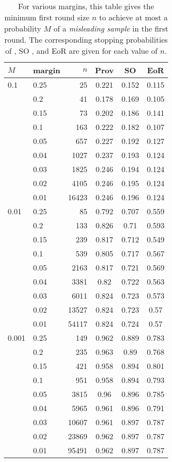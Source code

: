 \begin{table}
\center
\begin{tabular}{ |l|l|r|c|c|c| }
\hline
$M$ & margin & $n$ & Prov & SO & EoR \\
\hline
0.1&0.25&25&0.221&0.152&0.115\\
&0.2&41&0.178&0.169&0.105\\
&0.15&73&0.202&0.186&0.141\\
&0.1&163&0.222&0.182&0.107\\
&0.05&657&0.227&0.192&0.127\\
&0.04&1027&0.237&0.193&0.124\\
&0.03&1825&0.246&0.194&0.124\\
&0.02&4105&0.246&0.195&0.124\\
&0.01&16423&0.246&0.196&0.124\\
\hline
0.01&0.25&85&0.792&0.707&0.559\\
&0.2&133&0.826&0.71&0.593\\
&0.15&239&0.817&0.712&0.549\\
&0.1&539&0.805&0.717&0.567\\
&0.05&2163&0.817&0.721&0.569\\
&0.04&3381&0.82&0.722&0.563\\
&0.03&6011&0.824&0.723&0.573\\
&0.02&13527&0.824&0.723&0.57\\
&0.01&54117&0.824&0.724&0.57\\
\hline
0.001&0.25&149&0.962&0.889&0.783\\
&0.2&235&0.963&0.89&0.768\\
&0.15&421&0.958&0.894&0.801\\
&0.1&951&0.958&0.894&0.793\\
&0.05&3815&0.96&0.896&0.785\\
&0.04&5965&0.961&0.896&0.791\\
&0.03&10607&0.961&0.897&0.787\\
&0.02&23869&0.962&0.897&0.787\\
&0.01&95491&0.962&0.897&0.787\\
\hline
\end{tabular}
\caption{For various margins, this table gives the minimum first round size $n$ to achieve at most a probability $M$ of a \emph{misleading sample} in the first round. The corresponding stopping probabilities of \Providence, SO \BRAVO, and EoR \BRAVO are given for each value of $n$.}
\label{tab:misleading}
\end{table}

